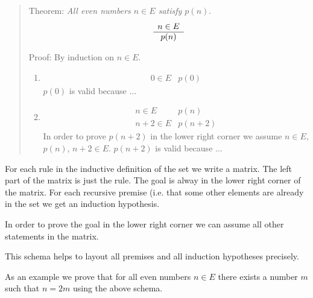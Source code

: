 \begin{quote}
    Theorem: \emph{All even numbers $n \in E$ satisfy $p(n)$}.
    $$
    \begin{array}{c} n \in E \\ \hline p(n)\end{array}
    $$

    Proof: By induction on $n \in E$.
    \begin{enumerate}
    \item
        $$
        \begin{array}{l|l}
        0 \in E
        & p(0)
        \end{array}
        $$
        $p(0)$ is valid because $\ldots$

    \item
        $$
        \begin{array}{l|l}
            n \in E
            &
            p(n)
            \\
            \hline
            n+2 \in E
            &
            p(n+2)
        \end{array}
        $$
        In order to prove $p(n+2)$ in the lower right corner we assume $n \in
        E$, $p(n)$, $n+2 \in E$. $p(n+2)$ is valid because $\ldots$
    \end{enumerate}
\end{quote}

For each rule in the inductive definition of the set we write a matrix. The left
part of the matrix is just the rule. The goal is alway in the lower right corner
of the matrix. For each recursive premise (i.e. that some other elements are
already in the set we get an induction hypothesis.

In order to prove the goal in the lower right corner we can assume all other
statements in the matrix.

This schema helps to layout all premises and all induction hypotheses precisely.

As an example we prove that for all even numbers $n \in E$ there exists a number
$m$ such that $n = 2m$ using the above schema.

